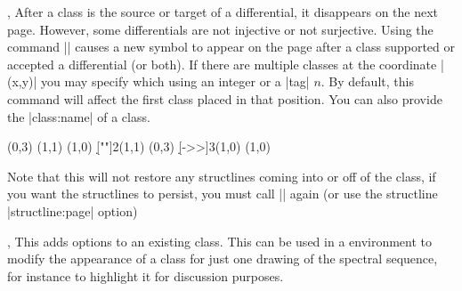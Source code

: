 \begin{sseqdata}[|| name = ex1, cohomological Serre grading]
\begin{commandlist}{{\replaceclass\ooptions{}},\replaceclass\ooptions{}}
After a class is the source or target of a differential, it disappears on the next page. However, some differentials are not injective or not surjective. Using the command |\replaceclass| causes a new symbol to appear on the page after a class supported or accepted a differential (or both). If there are multiple classes at the coordinate |(x,y)| you may specify which using an integer or a |tag| $n$. By default, this command will affect the first class placed in that position. You can also provide the |class:name| of a class.
\begin{codeexample}[]
\begin{sseqdata}[name = replace class example, Adams grading, classes = {draw = none } ]
\class["\mathbb{Z}"](0,3)
\class["\mathbb{Z}"](1,1)
\class["\mathbb{Z}"](1,0)
\d[""]2(1,1)
\replaceclass["\mathbb{Z}/2"](0,3)
\d[->>]3(1,0)
\replaceclass["2\mathbb{Z}"](1,0)
\end{sseqdata}
\printpage[ name = replace class example, page = 2 ] \qquad
\printpage[ name = replace class example, page = 3 ] \qquad
\printpage[ name = replace class example, page = 4 ]
\end{codeexample}
Note that this will not restore any structlines coming into or off of the class, if you want the structlines to persist, you must call |\structline| again (or use the structline |structline:page| option)
\end{commandlist}

\begin{commandlist}{{\classoptions\moptions{}},\classoptions\moptions{}}
This adds options to an existing class. This can be used in a \sseqpageenv\space environment to modify the appearance of a class for just one drawing of the spectral sequence, for instance to highlight it for discussion purposes.


\end{commandlist}
\end{sseqdata}
